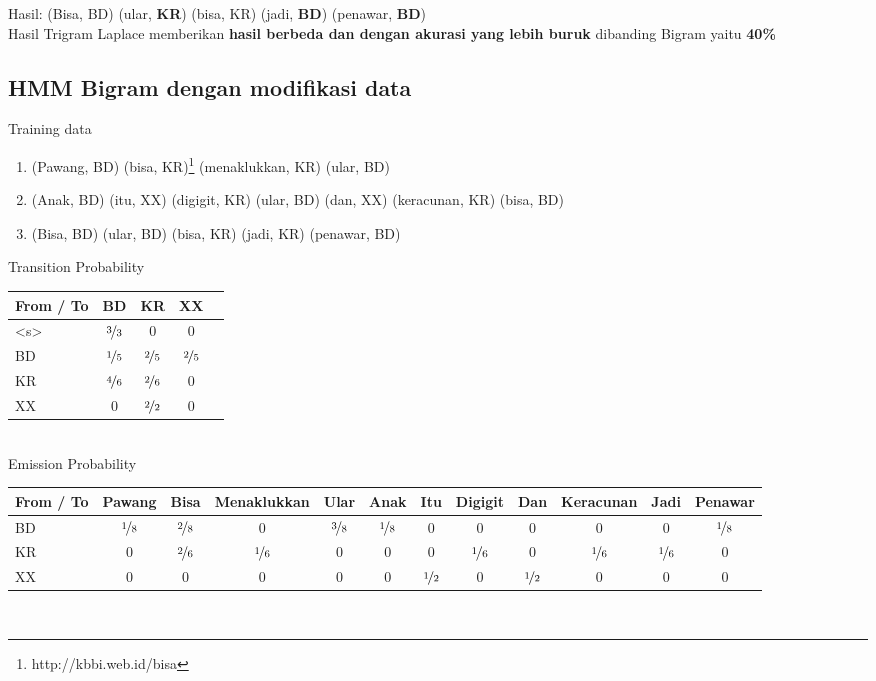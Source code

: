\documentclass[paper=a4, fontsize=11pt]{scrartcl} %
\numberwithin{equation}{section} %
\numberwithin{figure}{section} %
\numberwithin{table}{section} %
\begin{document}
Hasil: (Bisa, BD) (ular, \textbf{KR}) (bisa, KR) (jadi, \textbf{BD}) (penawar, \textbf{BD}) \\
Hasil Trigram Laplace memberikan \textbf{hasil berbeda dan dengan akurasi yang lebih buruk} dibanding Bigram yaitu \textbf{40\%}\\

\subsection{HMM Bigram dengan modifikasi data}

Training data
\begin{enumerate}
	\item (Pawang, BD) (bisa, KR)\footnote{http://kbbi.web.id/bisa} (menaklukkan, KR) (ular, BD)
	\item (Anak, BD) (itu, XX) (digigit, KR) (ular, BD) (dan, XX) (keracunan, KR) (bisa, BD)	
	\item (Bisa, BD) (ular, BD) (bisa, KR) (jadi, KR) (penawar, BD)
\end{enumerate}

Transition Probability \\
\begin{tabular}{ | l | c | c | c | c |}
	\hline
	From / To & BD & KR & XX \\ \hline
	<s> & $\nicefrac{3}{3}$ & 0 & 0 \\ \hline
	BD & $\nicefrac{1}{5}$ & $\nicefrac{2}{5}$ & $\nicefrac{2}{5}$ \\ \hline
	KR & $\nicefrac{4}{6}$ & $\nicefrac{2}{6}$ & 0 \\ \hline
	XX & 0 & $\nicefrac{2}{2}$ & 0 \\ \hline
\end{tabular} \\ [8pt]

Emission Probability \\
\begin{tabular}{ | l | c | c | c | c | c | c | c | c | c | c | c |}
	\hline
	From / To & Pawang & Bisa & {\tiny Menaklukkan} & Ular & Anak & Itu & {\tiny Digigit} & Dan & {\tiny Keracunan} & {\tiny Jadi} & {\tiny Penawar} \\ \hline
	BD & $\nicefrac{1}{8}$ & $\nicefrac{2}{8}$ & 0 & $\nicefrac{3}{8}$ & $\nicefrac{1}{8}$ & 0 & 0 & 0 & 0 & 0 & $\nicefrac{1}{8}$ \\ \hline
	KR & 0 & $\nicefrac{2}{6}$ & $\nicefrac{1}{6}$ & 0 & 0 & 0 & $\nicefrac{1}{6}$ & 0 & $\nicefrac{1}{6}$ & $\nicefrac{1}{6}$ & 0 \\ \hline
	XX & 0 & 0 & 0 & 0 & 0 & $\nicefrac{1}{2}$ & 0 & $\nicefrac{1}{2}$ & 0 & 0 & 0 \\ \hline
\end{tabular} \\ [8pt]
\end{document}

